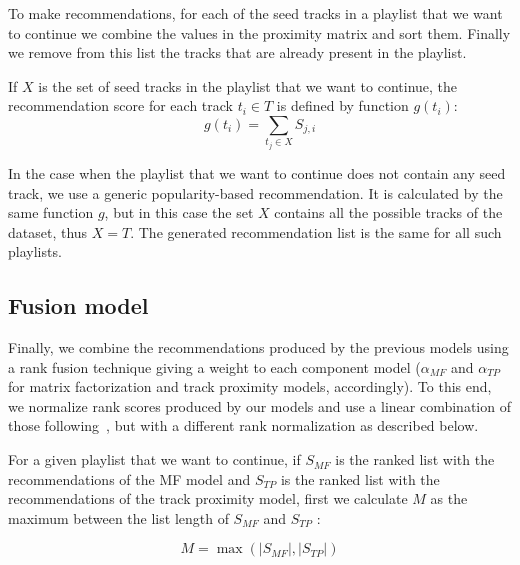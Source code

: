 To make recommendations, for each of the seed tracks in a playlist that we want to continue we combine the values in the proximity matrix and sort them. Finally we remove from this list the tracks that are already present in the playlist.

If $X$ is the set of seed tracks in the playlist that we want to continue, the recommendation score for each track $t_{i} \in T$ is defined by function $g(t_{i})$:
\begin{displaymath}
  g(t_{i}) = \sum_{t_{j} \in X} S_{j,i}
\end{displaymath}

In the case when the playlist that we want to continue does not contain any seed track, we use a generic popularity-based recommendation. It is calculated by the same function $g$, but in this case the set $X$ contains all the possible tracks of the dataset, thus  $X=T$. The generated recommendation list is the same for all such playlists.

\subsection{Fusion model}


Finally, we combine the recommendations produced by the previous models using a rank fusion technique giving a weight to each component model ($\alpha_{MF}$ and  $\alpha_{TP}$ for matrix factorization and track proximity models, accordingly). To this end, we normalize rank scores produced by our models and use a linear combination of those following~\cite{zhang2010fusion}, but with a different rank normalization as described below.


For a given playlist that we want to continue, if $S_{MF}$ is the ranked list with the recommendations of the MF model and $S_{TP}$ is the ranked list with the recommendations of the track proximity model, first we calculate $M$ as the maximum between the list length of $S_{MF}$ and $S_{TP}$ :


\begin{displaymath}
  M = \max(|S_{MF}|, |S_{TP}|)
\end{displaymath}


